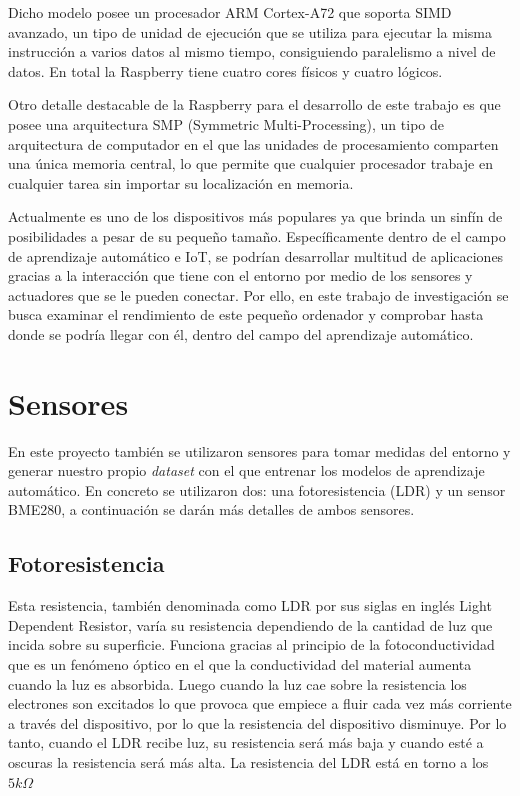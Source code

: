 \documentclass[a4paper, 12pt]{book}
\begin{document}
Dicho modelo posee un procesador ARM Cortex-A72 que soporta SIMD avanzado, un tipo de unidad de ejecución que se utiliza para ejecutar la misma instrucción a varios datos al mismo tiempo, consiguiendo paralelismo a nivel de datos. En total la Raspberry tiene cuatro cores físicos y cuatro lógicos. 

Otro detalle destacable de la Raspberry para el desarrollo de este trabajo es que posee una arquitectura SMP (Symmetric Multi-Processing), un tipo de arquitectura de computador en el que las unidades de procesamiento comparten una única memoria central, lo que permite que cualquier procesador trabaje en cualquier tarea sin importar su localización en memoria. 

Actualmente es uno de los dispositivos más populares ya que brinda un sinfín de posibilidades a pesar de su pequeño tamaño. Específicamente dentro de el campo de aprendizaje automático e IoT, se podrían desarrollar multitud de aplicaciones gracias a la interacción que tiene con el entorno por medio de los sensores y actuadores que se le pueden conectar. Por ello, en este trabajo de investigación se busca examinar el rendimiento de este pequeño ordenador y comprobar hasta donde se podría llegar con él, dentro del campo del aprendizaje automático. 


\section{Sensores}
\label{sec:sensores}

En este proyecto también se utilizaron sensores para tomar medidas del entorno y generar nuestro propio \textit{dataset} con el que entrenar los modelos de aprendizaje automático. En concreto se utilizaron dos: una fotoresistencia (LDR) y un sensor BME280, a continuación se darán más detalles de ambos sensores.

\subsection{Fotoresistencia}
\label{subsec:fotoresistencia}

Esta resistencia, también denominada como LDR por sus siglas en inglés Light Dependent Resistor, varía su resistencia dependiendo de la cantidad de luz que incida sobre su superficie. Funciona gracias al principio de la fotoconductividad que es un fenómeno óptico en el que la conductividad del material aumenta cuando la luz es absorbida. Luego cuando la luz cae sobre la resistencia los electrones son excitados lo que provoca que empiece a fluir cada vez más corriente a través del dispositivo, por lo que la resistencia del dispositivo disminuye. Por lo tanto, cuando el LDR recibe luz, su resistencia será más baja y cuando esté a oscuras la resistencia será más alta. La resistencia del LDR está en torno a los $5 k\Omega$
\end{document}
